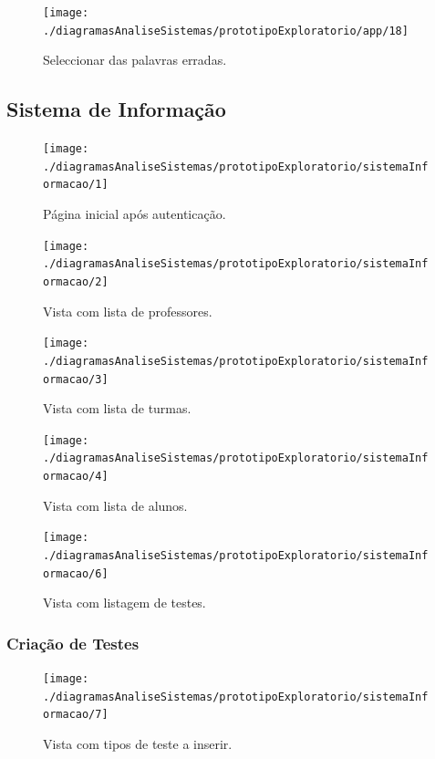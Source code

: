 \documentclass[a4paper]{article}
\begin{document}
\begin{figure}[h]
\centering
\texttt{[image: ./diagramasAnaliseSistemas/prototipoExploratorio/app/18]}
\caption{Seleccionar das palavras erradas.}
\label{fig:18}
\end{figure}

\newpage

		\subsection{Sistema de Informação}
		
		\begin{figure}[h]
			\centering
			\texttt{[image: ./diagramasAnaliseSistemas/prototipoExploratorio/sistemaInformacao/1]}
			\caption{Página inicial após autenticação.}
			\label{fig:1}
		\end{figure}
		
		\begin{figure}[h]
			\centering
			\texttt{[image: ./diagramasAnaliseSistemas/prototipoExploratorio/sistemaInformacao/2]}
			\caption{Vista com lista de professores.}
			\label{fig:2}
		\end{figure}
\newpage
	\begin{figure}[h]
		\centering
		\texttt{[image: ./diagramasAnaliseSistemas/prototipoExploratorio/sistemaInformacao/3]}
		\caption{Vista com lista de turmas.}
		\label{fig:3}
	\end{figure}

	\begin{figure}[h]
		\centering
		\texttt{[image: ./diagramasAnaliseSistemas/prototipoExploratorio/sistemaInformacao/4]}
		\caption{Vista com lista de alunos.}
		\label{fig:4}
	\end{figure}
	
	\newpage
		\begin{figure}[h]
			\centering
			\texttt{[image: ./diagramasAnaliseSistemas/prototipoExploratorio/sistemaInformacao/6]}
			\caption{Vista com listagem de testes.}
			\label{fig:5}
		\end{figure}
		
		\subsubsection{Criação de Testes}
		
		\begin{figure}[h]
				\centering
				\texttt{[image: ./diagramasAnaliseSistemas/prototipoExploratorio/sistemaInformacao/7]}
				\caption{Vista com tipos de teste a inserir.}
				\label{fig:5}
			\end{figure}	
			
\end{document}

